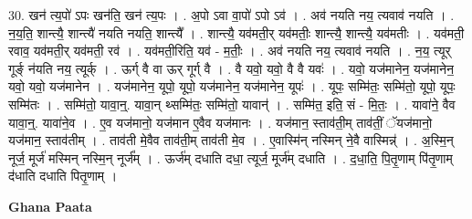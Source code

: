 \documentclass[17pt]{extarticle}
\begin{document}
30. खन॑ त्य॒पो॑ ऽपः खन॑ति॒ खन॑ त्य॒पः । . अ॒पो ऽवा वा॒पो॑ ऽपो ऽव॑ । . अव॑ नयति नय॒ त्यवाव॑ नयति । . न॒य॒ति॒ शान्त्यै॒ शान्त्यै॑ नयति नयति॒ शान्त्यै᳚ । . शान्त्यै॒ यव॑मती॒र् यव॑मतीः॒ शान्त्यै॒ शान्त्यै॒ यव॑मतीः । . यव॑मती॒ रवाव॒ यव॑मती॒र् यव॑मती॒ रव॑ । . यव॑मती॒रिति॒ यव॑ - म॒तीः॒ । . अव॑ नयति नय॒ त्यवाव॑ नयति । . न॒य॒ त्यूर् गूर्ङ् न॑यति नय॒ त्यूर्क् । . ऊर्ग् वै वा ऊर् गूर्ग् वै । . वै यवो॒ यवो॒ वै वै यवः॑ । . यवो॒ यज॑मानेन॒ यज॑मानेन॒ यवो॒ यवो॒ यज॑मानेन । . यज॑मानेन॒ यूपो॒ यूपो॒ यज॑मानेन॒ यज॑मानेन॒ यूपः॑ । . यूपः॒ सम्मि॑तः॒ सम्मि॑तो॒ यूपो॒ यूपः॒ सम्मि॑तः । . सम्मि॑तो॒ यावा॒न्॒. यावा॒न् थ्सम्मि॑तः॒ सम्मि॑तो॒ यावान्॑ । . सम्मि॑त॒ इति॒ सं - मि॒तः॒ । . यावा॑ने॒ वैव यावा॒न्॒. यावा॑ने॒व । . ए॒व यज॑मानो॒ यज॑मान ए॒वैव यज॑मानः । . यज॑मान॒ स्ताव॑ती॒म् ताव॑तीं॒ ॅयज॑मानो॒ यज॑मान॒ स्ताव॑तीम् । . ताव॑ती मे॒वैव ताव॑ती॒म् ताव॑ती मे॒व । . ए॒वास्मि॑न् नस्मिन् ने॒वै वास्मिन्न्॑ । . अ॒स्मि॒न् नूर्ज॒ मूर्ज॑ मस्मिन् नस्मि॒न् नूर्ज᳚म् । . ऊर्ज॑म् दधाति दधा॒ त्यूर्ज॒ मूर्ज॑म् दधाति । . द॒धा॒ति॒ पि॒तृ॒णाम् पि॑तृ॒णाम् द॑धाति दधाति पितृ॒णाम् । \newline

\textbf{Ghana Paata } \newline
\end{document}
